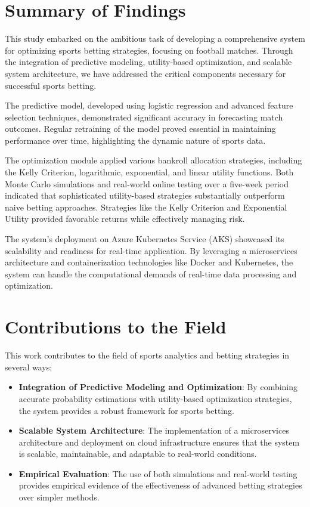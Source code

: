 \section{Summary of Findings}

This study embarked on the ambitious task of developing a comprehensive system for optimizing sports betting strategies, focusing on football matches. Through the integration of predictive modeling, utility-based optimization, and scalable system architecture, we have addressed the critical components necessary for successful sports betting.

The predictive model, developed using logistic regression and advanced feature selection techniques, demonstrated significant accuracy in forecasting match outcomes. Regular retraining of the model proved essential in maintaining performance over time, highlighting the dynamic nature of sports data.

The optimization module applied various bankroll allocation strategies, including the Kelly Criterion, logarithmic, exponential, and linear utility functions. Both Monte Carlo simulations and real-world online testing over a five-week period indicated that sophisticated utility-based strategies substantially outperform naive betting approaches. Strategies like the Kelly Criterion and Exponential Utility provided favorable returns while effectively managing risk.

The system's deployment on Azure Kubernetes Service (AKS) showcased its scalability and readiness for real-time application. By leveraging a microservices architecture and containerization technologies like Docker and Kubernetes, the system can handle the computational demands of real-time data processing and optimization.

\section{Contributions to the Field}

This work contributes to the field of sports analytics and betting strategies in several ways:

\begin{itemize} \item \textbf{Integration of Predictive Modeling and Optimization}: By combining accurate probability estimations with utility-based optimization strategies, the system provides a robust framework for sports betting. \item \textbf{Scalable System Architecture}: The implementation of a microservices architecture and deployment on cloud infrastructure ensures that the system is scalable, maintainable, and adaptable to real-world conditions. \item \textbf{Empirical Evaluation}: The use of both simulations and real-world testing provides empirical evidence of the effectiveness of advanced betting strategies over simpler methods. \end{itemize}

